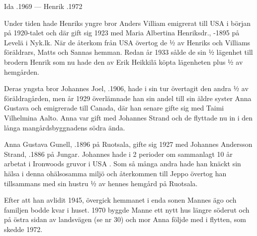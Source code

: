 Ida .1969  ---  Henrik .1972

Under tiden hade Henriks yngre bror Anders Villiam emigrerat till USA i början på 1920-talet och där gift sig 1923 med Maria Albertina Henriksdr., -1895 på Levelä i Nyk.lk. När de återkom från USA övertog de ½ av Henriks och Villiams föräldrars,  Matts och Sannas hemman. Redan år 1933 sålde de sin ½ lägenhet till brodern Henrik som nu hade den av Erik Heikkilä köpta lägenheten plus ½ av hemgården.

Deras yngsta bror Johannes Joel, .1906, hade i sin tur övertagit den andra ½  av föräldragården, men år 1929  överlämnade han sin andel till sin äldre syster Anna Gustava och emigrerade till Canada, där han senare gifte sig med Taimi Vilhelmina Aalto. Anna var gift med Johannes Strand och de flyttade nu in i den långa mangårdsbyggnadens södra ända.


%
Anna Gustava Gunell, .1896 på Ruotsala, gifte sig 1927 med Johannes Andersson Strand, .1886 på Jungar. Johannes hade i 2 perioder om sammanlagt 10 år arbetat i Ironwoods gruvor i USA . Som så många andra hade han knäckt sin hälsa i denna ohälsosamma miljö och återkommen till Jeppo övertog han tillsammans med sin hustru ½ av hennes hemgård på Ruotsala.

Efter att han avlidit 1945, övergick hemmanet i enda sonen Mannes ägo och familjen bodde kvar i huset. 1970 byggde Manne ett nytt hus längre söderut och på östra sidan av landsvägen (se nr 30) och mor Anna följde med i flytten, som skedde 1972.
\begin{jhchildren}
  \item {}
  \item {}
  \item {}
  \item {}
  \item {}
  \item {}
  \item {}
\end{jhchildren}

